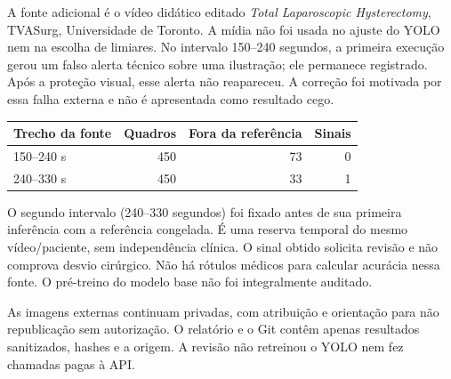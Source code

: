 {A fonte adicional é o vídeo didático editado \textit{Total Laparoscopic Hysterectomy}, TVASurg, Universidade de Toronto. A mídia não foi usada no ajuste do YOLO nem na escolha de limiares. No intervalo 150--240 segundos, a primeira execução gerou um falso alerta técnico sobre uma ilustração; ele permanece registrado. Após a proteção visual, esse alerta não reapareceu. A correção foi motivada por essa falha externa e não é apresentada como resultado cego.

\begin{center}\small\begin{tabular}{lrrr}\toprule Trecho da fonte & Quadros & Fora da referência & Sinais\\\midrule

150--240 s & 450 & 73 & 0\\

240--330 s & 450 & 33 & 1\\

\bottomrule\end{tabular}\end{center}

O segundo intervalo (240--330 segundos) foi fixado antes de sua primeira inferência com a referência congelada. É uma reserva temporal do mesmo vídeo/paciente, sem independência clínica. O sinal obtido solicita revisão e não comprova desvio cirúrgico. Não há rótulos médicos para calcular acurácia nessa fonte. O pré-treino do modelo base não foi integralmente auditado.

As imagens externas continuam privadas, com atribuição e orientação para não republicação sem autorização. O relatório e o Git contêm apenas resultados sanitizados, hashes e a origem. A revisão não retreinou o YOLO nem fez chamadas pagas à API.
}
\newcommand{\ComandosReproducao}{%
\begin{enumerate}
\item Preparar o ambiente Python e obter os arquivos Git LFS conforme o README.
\item Abrir o painel com \code{python -m techchallenge4.dashboard} e acessar o endereço local exibido.
\item Selecionar o áudio e o vídeo, informar a chave da API e processar a consulta.
\item Abrir os detalhes do caso e confirmar a revisão. Os relatórios e o banco são gravados em \path{integracao/saidas/painel/}.
\item Consultar os notebooks para as partições, os resultados de avaliação e as limitações por modalidade.
\end{enumerate}
}
